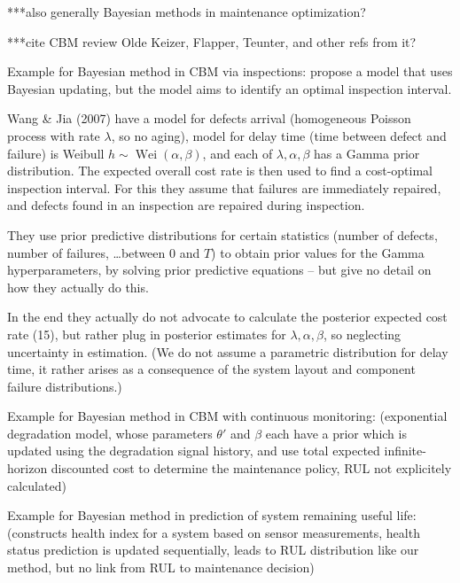 \documentclass[authoryear]{elsarticle}
\newcommand{\wei}{\operatorname{Wei}} %
\begin{document}
***also generally Bayesian methods in maintenance optimization?

***cite CBM review Olde Keizer, Flapper, Teunter, and other refs from it?


Example for Bayesian method in CBM via inspections: \cite{2007:wang-jia}
propose a model that uses Bayesian updating,
but the model aims to identify an optimal inspection interval.

\begin{scriptsize}
Wang \& Jia (2007) have a model for defects arrival (homogeneous Poisson process with rate $\lambda$, so no aging),
model for delay time (time between defect and failure) is Weibull $h \sim \wei(\alpha,\beta)$,
and each of $\lambda, \alpha, \beta$ has a Gamma prior distribution.
The expected overall cost rate is then used to find a cost-optimal inspection interval.
For this they assume that failures are immediately repaired,
and defects found in an inspection are repaired during inspection.

They use prior predictive distributions for certain statistics (number of defects, number of failures, \ldots between $0$ and $T$)
to obtain prior values for the Gamma hyperparameters,
by solving prior predictive equations -- but give no detail on how they actually do this.

In the end they actually do not advocate to calculate the posterior expected cost rate (15),
but rather plug in posterior estimates for $\lambda, \alpha, \beta$,
so neglecting uncertainty in estimation.
(We do not assume a parametric distribution for delay time,
it rather arises as a consequence of the system layout and component failure distributions.)

\end{scriptsize}

Example for Bayesian method in CBM with continuous monitoring: \cite{2011:elwany-et-al}
(exponential degradation model, whose parameters $\theta'$ and $\beta$ each have a prior
which is updated using the degradation signal history,
and use total expected infinite-horizon discounted cost to determine the maintenance policy,
RUL not explicitely calculated)

Example for Bayesian method in prediction of system remaining useful life: \cite{2012:sun-et-al}
(constructs health index for a system based on sensor measurements,
health status prediction is updated sequentially,
leads to RUL distribution like our method,
but no link from RUL to maintenance decision)
\end{document}

